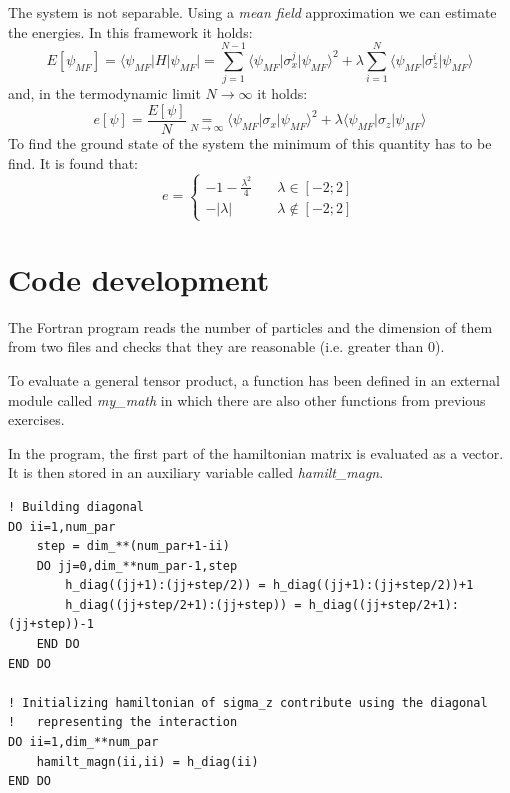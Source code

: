 \documentclass[12pt, a4paper, notitlepage]{report}
\begin{document}
The system is not separable. Using a \textit{mean field} approximation we can estimate the energies. In this framework it holds:
\begin{equation}
	E[\psi_{MF}] = \langle \psi_{MF} \rvert H \lvert \psi_{MF} \rvert = \sum_{j=1}^{N-1} \langle \psi_{MF} \rvert \sigma_x^j \lvert \psi_{MF} \rangle^2 + \lambda \sum_{i=1}^{N} \langle \psi_{MF} \rvert \sigma_z^i \lvert \psi_{MF} \rangle
\end{equation}
and, in the termodynamic limit $N \to \infty$ it holds:
\begin{equation}
	e[\psi] = \frac{E[\psi]}{N} \underset{N \to \infty}{=} \langle \psi_{MF} \rvert \sigma_x \lvert \psi_{MF} \rangle^2 + \lambda \langle \psi_{MF} \rvert \sigma_z \lvert \psi_{MF} \rangle
\end{equation}
To find the ground state of the system the minimum of this quantity has to be find. It is found that:
\begin{equation}
	e = \begin{cases}
	-1 - \frac{\lambda^2}{4} & \quad \lambda \in [-2;2] \\
	-\lvert \lambda \rvert & \quad \lambda \notin [-2;2]
	\end{cases}
\end{equation}


\section*{Code development}
The Fortran program reads the number of particles and the dimension of them from two files and checks that they are reasonable (i.e. greater than 0).

To evaluate a general tensor product, a function has been defined in an external module called \textit{my\_math} in which there are also other functions from previous exercises.

In the program, the first part of the hamiltonian matrix is evaluated as a vector. It is then stored in an auxiliary variable called \textit{hamilt\_magn}.

\begin{lstlisting}
! Building diagonal
DO ii=1,num_par
	step = dim_**(num_par+1-ii)
	DO jj=0,dim_**num_par-1,step
		h_diag((jj+1):(jj+step/2)) = h_diag((jj+1):(jj+step/2))+1
		h_diag((jj+step/2+1):(jj+step)) = h_diag((jj+step/2+1):(jj+step))-1
	END DO
END DO

! Initializing hamiltonian of sigma_z contribute using the diagonal
!	representing the interaction
DO ii=1,dim_**num_par
	hamilt_magn(ii,ii) = h_diag(ii)
END DO
\end{lstlisting}
\end{document}
